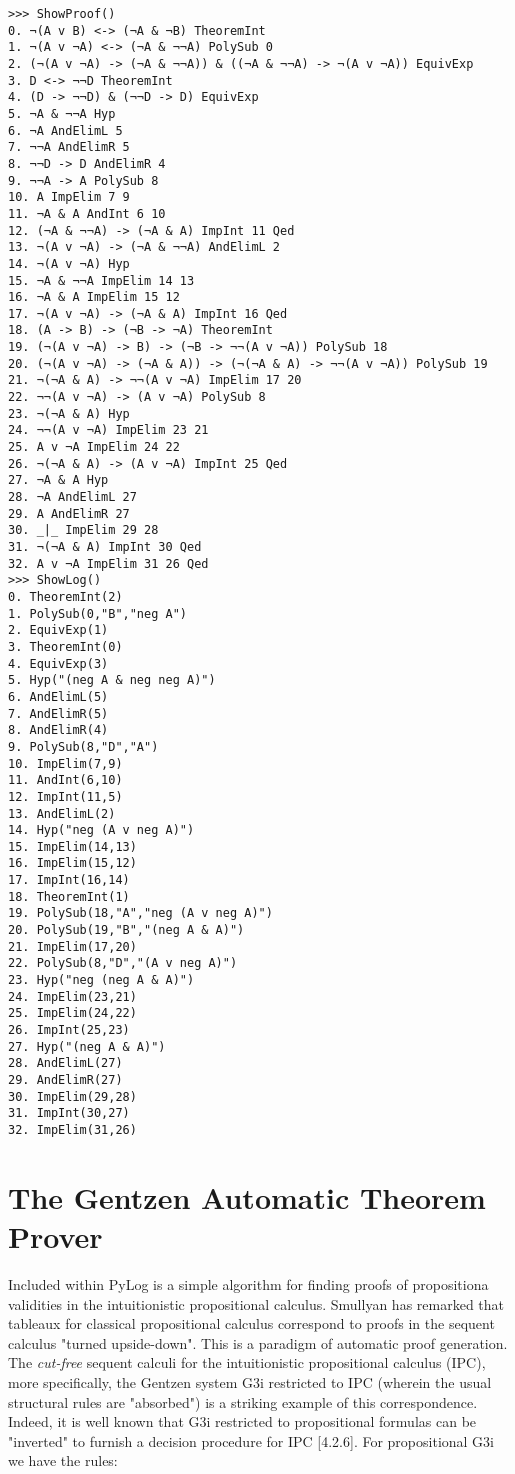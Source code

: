 \documentclass[a4paper,12pt,leqno]{article}
\numberwithin{equation}{section}
\begin{document}
\begin{verbatim}
>>> ShowProof()
0. ¬(A v B) <-> (¬A & ¬B) TheoremInt 
1. ¬(A v ¬A) <-> (¬A & ¬¬A) PolySub 0
2. (¬(A v ¬A) -> (¬A & ¬¬A)) & ((¬A & ¬¬A) -> ¬(A v ¬A)) EquivExp 
3. D <-> ¬¬D TheoremInt 
4. (D -> ¬¬D) & (¬¬D -> D) EquivExp 
5. ¬A & ¬¬A Hyp 
6. ¬A AndElimL 5
7. ¬¬A AndElimR 5
8. ¬¬D -> D AndElimR 4
9. ¬¬A -> A PolySub 8
10. A ImpElim 7 9
11. ¬A & A AndInt 6 10
12. (¬A & ¬¬A) -> (¬A & A) ImpInt 11 Qed
13. ¬(A v ¬A) -> (¬A & ¬¬A) AndElimL 2
14. ¬(A v ¬A) Hyp 
15. ¬A & ¬¬A ImpElim 14 13
16. ¬A & A ImpElim 15 12
17. ¬(A v ¬A) -> (¬A & A) ImpInt 16 Qed
18. (A -> B) -> (¬B -> ¬A) TheoremInt 
19. (¬(A v ¬A) -> B) -> (¬B -> ¬¬(A v ¬A)) PolySub 18
20. (¬(A v ¬A) -> (¬A & A)) -> (¬(¬A & A) -> ¬¬(A v ¬A)) PolySub 19
21. ¬(¬A & A) -> ¬¬(A v ¬A) ImpElim 17 20
22. ¬¬(A v ¬A) -> (A v ¬A) PolySub 8
23. ¬(¬A & A) Hyp 
24. ¬¬(A v ¬A) ImpElim 23 21
25. A v ¬A ImpElim 24 22
26. ¬(¬A & A) -> (A v ¬A) ImpInt 25 Qed
27. ¬A & A Hyp 
28. ¬A AndElimL 27
29. A AndElimR 27
30. _|_ ImpElim 29 28
31. ¬(¬A & A) ImpInt 30 Qed
32. A v ¬A ImpElim 31 26 Qed
>>> ShowLog()
0. TheoremInt(2)
1. PolySub(0,"B","neg A")
2. EquivExp(1)
3. TheoremInt(0)
4. EquivExp(3)
5. Hyp("(neg A & neg neg A)")
6. AndElimL(5)
7. AndElimR(5)
8. AndElimR(4)
9. PolySub(8,"D","A")
10. ImpElim(7,9)
11. AndInt(6,10)
12. ImpInt(11,5)
13. AndElimL(2)
14. Hyp("neg (A v neg A)")
15. ImpElim(14,13)
16. ImpElim(15,12)
17. ImpInt(16,14)
18. TheoremInt(1)
19. PolySub(18,"A","neg (A v neg A)")
20. PolySub(19,"B","(neg A & A)")
21. ImpElim(17,20)
22. PolySub(8,"D","(A v neg A)")
23. Hyp("neg (neg A & A)")
24. ImpElim(23,21)
25. ImpElim(24,22)
26. ImpInt(25,23)
27. Hyp("(neg A & A)")
28. AndElimL(27)
29. AndElimR(27)
30. ImpElim(29,28)
31. ImpInt(30,27)
32. ImpElim(31,26)
\end{verbatim}



\section*{The Gentzen Automatic Theorem Prover}

Included within PyLog is a simple algorithm for finding proofs of propositiona validities in the intuitionistic propositional calculus. Smullyan \cite{smu} has remarked that tableaux for classical propositional calculus correspond to proofs in the sequent calculus "turned upside-down".
This is a paradigm of automatic proof generation.
The \emph{cut-free} sequent calculi for the intuitionistic propositional calculus (IPC), more specifically, the Gentzen system G3i
restricted to IPC (wherein the usual structural rules are "absorbed") is a striking example of this correspondence. 
Indeed, it is well known that G3i restricted to propositional formulas can be "inverted" to furnish a 
decision procedure for IPC \cite{tro}[4.2.6].
For propositional G3i we have the rules:
\end{document}
